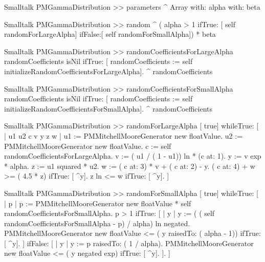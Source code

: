 \begin{displaycode}{Smalltalk}
PMGammaDistribution >> parameters
    ^ Array with: alpha with: beta
\end{displaycode}

\begin{displaycode}{Smalltalk}
PMGammaDistribution >> random
    ^ ( alpha > 1 ifTrue: [ self randomForLargeAlpha]
                        ifFalse:[ self randomForSmallAlpha]) * beta
\end{displaycode}

\begin{displaycode}{Smalltalk}
PMGammaDistribution >> randomCoefficientsForLargeAlpha
    randomCoefficients isNil
        ifTrue: [ randomCoefficients := self initializeRandomCoefficientsForLargeAlpha].
    ^ randomCoefficients
\end{displaycode}

\begin{displaycode}{Smalltalk}
PMGammaDistribution >> randomCoefficientsForSmallAlpha
    randomCoefficients isNil
        ifTrue: [ randomCoefficients := self 
                           initializeRandomCoefficientsForSmallAlpha].
    ^ randomCoefficients
\end{displaycode}

\begin{displaycode}{Smalltalk}
PMGammaDistribution >> randomForLargeAlpha
    [ true] whileTrue: [
    | u1 u2 c v y z w |
    u1 := PMMitchellMooreGenerator new floatValue.
    u2 := PMMitchellMooreGenerator new floatValue.
    c := self randomCoefficientsForLargeAlpha.
    v := ( u1 / ( 1 - u1)) ln * (c at: 1).
    y := v exp * alpha.
    z := u1 squared * u2.
    w := ( c at: 3) * v + ( c at: 2) - y.
    ( c at: 4) + w >= ( 4.5 * z) ifTrue: [ ^y].
    z ln <= w ifTrue: [ ^y].
    ]
\end{displaycode}

\begin{displaycode}{Smalltalk}
PMGammaDistribution >> randomForSmallAlpha
    [ true] whileTrue: [
    | p |
    p := PMMitchellMooreGenerator new floatValue * self 
                                      randomCoefficientsForSmallAlpha.
    p > 1
        ifTrue: [ | y |
                     y := ( ( self randomCoefficientsForSmallAlpha - 
                                               p) / alpha) ln negated.
                     PMMitchellMooreGenerator new floatValue <= ( y 
                                               raisedTo: ( alpha - 1))
                        ifTrue: [ ^y].
                    ]
        ifFalse: [ | y |
                        y := p raisedTo: ( 1 / alpha).
                     PMMitchellMooreGenerator new floatValue <= ( y 
                                                          negated exp)
                        ifTrue: [ ^y].
                     ].
    ]
\end{displaycode}
    
